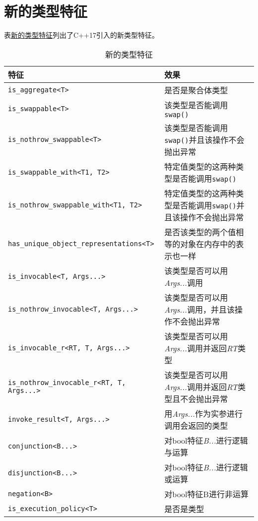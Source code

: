 \section{新的类型特征}
表\hyperref[t21.1]{新的类型特征}列出了C++17引入的新类型特征。
\begin{table}[htb]
    \centering
    \begin{tabular}{l|p{}}
        \hline
        \textbf{特征}                                        & \textbf{效果}                                   \\
        \hline
        \texttt{is\_aggregate<T>}                          & 是否是聚合体类型                                      \\
        \texttt{is\_swappable<T>}                          & 该类型是否能调用\texttt{swap()}                       \\
        \texttt{is\_nothrow\_swappable<T>}                 & 该类型是否能调用\texttt{swap()}并且该操作不会抛出异常            \\
        \texttt{is\_swappable\_with<T1, T2>}               & 特定值类型的这两种类型是否能调用\texttt{swap()}               \\
        \texttt{is\_nothrow\_swappable\_with<T1, T2>}      & 特定值类型的这两种类型是否能调用\texttt{swap()}并且该操作不会抛出异常    \\
        \texttt{has\_unique\_object\_representations<T>}   & 是否该类型的两个值相等的对象在内存中的表示也一样                      \\
        \texttt{is\_invocable<T, Args...>}                 & 该类型是否可以用\emph{Args...}调用                      \\
        \texttt{is\_nothrow\_invocable<T, Args...>}        & 该类型是否可以用\emph{Args...}调用，并且该操作不会抛出异常          \\
        \texttt{is\_invocable\_r<RT, T, Args...>}          & 该类型是否可以用\emph{Args...}调用并返回\emph{RT}类型        \\
        \texttt{is\_nothrow\_invocable\_r<RT, T, Args...>} & 该类型是否可以用\emph{Args...}调用并返回\emph{RT}类型且不会抛出异常 \\
        \texttt{invoke\_result<T, Args...>}                & 用\emph{Args...}作为实参进行调用会返回的类型                 \\
        \texttt{conjunction<B...>}                         & 对bool特征\emph{B...}进行逻辑与运算                     \\
        \texttt{disjunction<B...>}                         & 对bool特征\emph{B...}进行逻辑或运算                     \\
        \texttt{negation<B>}                               & 对bool特征B进行非运算                                 \\
        \texttt{is\_execution\_policy<T>}                  & 是否是\nameref{ch22.2}类型                         \\
        \hline
    \end{tabular}
    \caption{新的类型特征}
    \label{t21.1}
\end{table}

